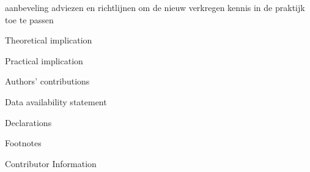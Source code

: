 aanbeveling
adviezen en richtlijnen om de nieuw verkregen kennis in de praktijk toe te passen



Theoretical implication

Practical implication

Authors' contributions

Data availability statement

Declarations

Footnotes

Contributor Information



\cite{oid}